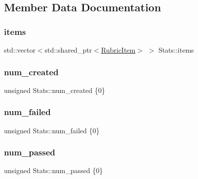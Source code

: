 \subsection{Member Data Documentation}
\hypertarget{class_stats_a07121ba8a0b750122d182cbb782b9658}{}\label{class_stats_a07121ba8a0b750122d182cbb782b9658} 
\subsubsection{\texorpdfstring{items}{items}}
{\footnotesize\ttfamily std\+::vector$<$std\+::shared\+\_\+ptr$<$\hyperlink{class_rubric_item}{Rubric\+Item}$>$ $>$ Stats\+::items}

\hypertarget{class_stats_aae6907517029159a56582d4050d37ba9}{}\label{class_stats_aae6907517029159a56582d4050d37ba9} 
\subsubsection{\texorpdfstring{num\+\_\+created}{num\_created}}
{\footnotesize\ttfamily unsigned Stats\+::num\+\_\+created \{0\}}

\hypertarget{class_stats_a157cacc8bc1d42348107d4beb98bb0bf}{}\label{class_stats_a157cacc8bc1d42348107d4beb98bb0bf} 
\subsubsection{\texorpdfstring{num\+\_\+failed}{num\_failed}}
{\footnotesize\ttfamily unsigned Stats\+::num\+\_\+failed \{0\}}

\hypertarget{class_stats_a23aed2b3b568c55072f0bbf67cb98766}{}\label{class_stats_a23aed2b3b568c55072f0bbf67cb98766} 
\subsubsection{\texorpdfstring{num\+\_\+passed}{num\_passed}}
{\footnotesize\ttfamily unsigned Stats\+::num\+\_\+passed \{0\}}

\hypertarget{class_stats_aad4b62381ae2f53d8449ed2adda1f112}{}\label{class_stats_aad4b62381ae2f53d8449ed2adda1f112} 
